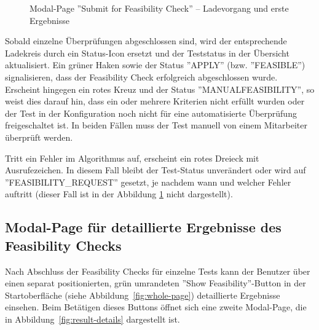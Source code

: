 \begin{figure}[!htbp] 
    \centering 
    \caption{Modal-Page ''Submit for Feasibility Check'' – Ladevorgang und erste Ergebnisse} 
    \label{fig:loading-with-results} 
\end{figure}

Sobald einzelne Überprüfungen abgeschlossen sind, wird der entsprechende Ladekreis durch ein Status-Icon ersetzt und der Teststatus in der Übersicht aktualisiert. Ein grüner Haken sowie der Status ''APPLY'' (bzw. ''FEASIBLE'') signalisieren, dass der Feasibility Check erfolgreich abgeschlossen wurde. Erscheint hingegen ein rotes Kreuz und der Status ''MANUALFEASIBILITY'', so weist dies darauf hin, dass ein oder mehrere Kriterien nicht erfüllt wurden oder der Test in der Konfiguration noch nicht für eine automatisierte Überprüfung freigeschaltet ist. In beiden Fällen muss der Test manuell von einem Mitarbeiter überprüft werden.

Tritt ein Fehler im Algorithmus auf, erscheint ein rotes Dreieck mit Ausrufezeichen. In diesem Fall bleibt der Test-Status unverändert oder wird auf ''FEASIBILITY\_REQUEST'' gesetzt, je nachdem wann und welcher Fehler auftritt (dieser Fall ist in der Abbildung \ref{fig:loading-with-results} nicht dargestellt).


\subsection{Modal-Page für detaillierte Ergebnisse des Feasibility Checks}

Nach Abschluss der Feasibility Checks für einzelne Tests kann der Benutzer über einen separat positionierten, grün umrandeten ''Show Feasibility''-Button in der Startoberfläche (siehe Abbildung~\ref{fig:whole-page}) detaillierte Ergebnisse einsehen. Beim Betätigen dieses Buttons öffnet sich eine zweite Modal-Page, die in Abbildung~\ref{fig:result-details} dargestellt ist.

